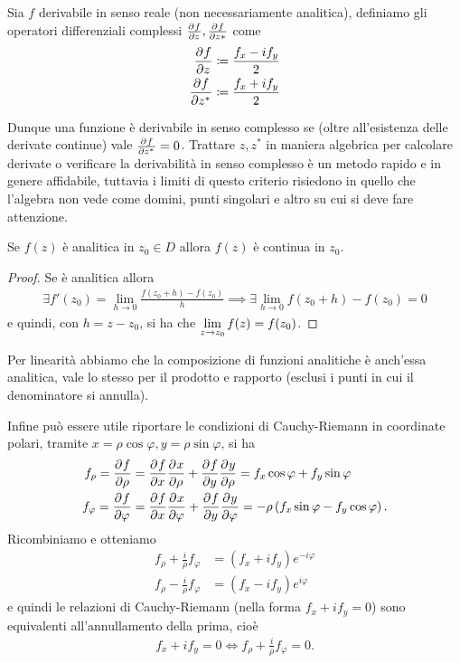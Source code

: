 \begin{definition}
  Sia $ f $ derivabile in senso reale (non necessariamente analitica), definiamo gli operatori differenziali complessi $ \frac{\partial^{} {f}}{\partial {z}^{}}, \frac{\partial^{} {f}}{\partial {z*}^{}} $ come
  \begin{align}
    \frac{\partial^{} {f}}{\partial {z}^{}} &\coloneq \frac{f_x -i f_y}{2}
    \\
    \frac{\partial^{} {f}}{\partial {z^*}^{}} &\coloneq \frac{f_x +i f_y}{2}
  \end{align}
\end{definition}
Dunque una funzione è derivabile in senso complesso se (oltre all'esistenza delle derivate continue) vale $ \frac{\partial^{} {f}}{\partial {z^*}^{}} = 0 $. Trattare $ z,z^* $ in 
maniera algebrica per calcolare derivate o verificare la derivabilità in senso complesso è un metodo rapido e in genere affidabile, tuttavia i limiti di 
questo criterio risiedono in quello che l'algebra non vede come domini, punti singolari e altro su cui si deve fare attenzione.

\begin{lemma}[  ]
  Se $ f(z) $ è analitica in $ z_0 \in D $ allora $ f(z) $ è continua in $ z_0 $.
\end{lemma}
\begin{proof}
  Se è analitica allora 
  \begin{align}
    \exists f'(z_0) = \lim_{h \to 0} \frac{f(z_0 + h) - f(z_0)}{h} \implies \exists \lim_{h \to 0} f(z_0 + h) - f(z_0) = 0 
  \end{align}
  e quindi, con $ h = z - z_0 $, si ha che $\displaystyle \lim_{z \to z_0} f(z) = f(z_0) $.
\end{proof}
Per linearità abbiamo che la composizione di funzioni analitiche è anch'essa analitica, vale lo stesso per il prodotto e rapporto (esclusi i punti in cui
il denominatore si annulla).

Infine può essere utile riportare le condizioni di Cauchy-Riemann in coordinate polari, tramite $ x = \rho \cos\varphi, y = \rho \sin \varphi $, si ha 
\begin{align}
  f_\rho = \der{f}{\rho} &= \der{f}{x} \der{x}{\rho} + \der{f}{y} \der{y}{\rho} = f_x \cos \varphi + f_y \sin \varphi
  \\
  f_\varphi = \der{f}{\varphi} &= \der{f}{x} \der{x}{\varphi} + \der{f}{y} \der{y}{\varphi} = - \rho \left( f_x \sin \varphi - f_y \cos \varphi \right).
\end{align}
Ricombiniamo e otteniamo 
\begin{align}
  f_\rho + \frac{i}\rho f_\varphi &= (f_x + if_y) e^{-i\varphi}
  \\
  f_\rho -\frac{i}{\rho} f_\varphi &= (f_x - if_y) e^{i \varphi}
\end{align}
e quindi le relazioni di Cauchy-Riemann (nella forma $ f_x + if_y = 0 $) sono equivalenti all'annullamento della prima, cioè
\begin{align}
  f_x + if_y = 0 \iff f_\rho + \frac{i}\rho f_\varphi = 0.
\end{align}


